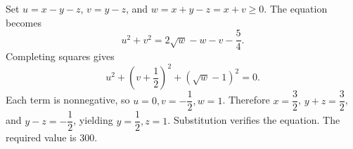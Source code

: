 Set $u=x-y-z$, $v=y-z$, and $w=x+y-z=x+v\ge0$. The equation becomes
\[
u^2+v^2=2\sqrt w-w-v-\dfrac{5}{4}.
\]
Completing squares gives
\[
u^2+(v+\dfrac{1}{2})^2+(\sqrt w-1)^2=0.
\]
Each term is nonnegative, so $u=0,v=-\dfrac{1}{2},w=1$. Therefore $x=\dfrac{3}{2}$, $y+z=\dfrac{3}{2}$, and $y-z=-\dfrac{1}{2}$, yielding $y=\dfrac{1}{2},z=1$. Substitution verifies the equation. The required value is $\boxed{300}$.
